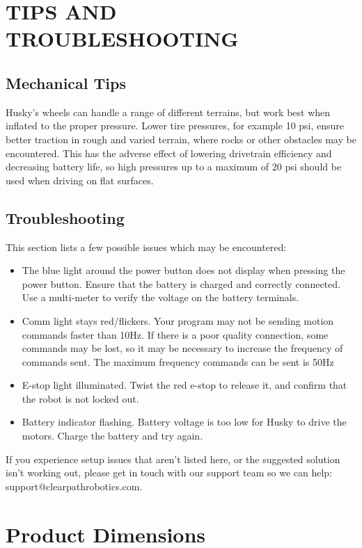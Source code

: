 \documentclass[]{clearpath-latex/clearpath-manual}
\begin{document}
\section{TIPS AND TROUBLESHOOTING}

\subsection{Mechanical Tips}
Husky’s wheels can handle a range of different terrains, but work best when inflated to the proper pressure. 
Lower tire pressures, for example 10 psi, ensure better traction in rough and varied terrain, where rocks or 
other obstacles may be encountered. This has the adverse effect of lowering drivetrain efficiency and decreasing 
battery life, so high pressures up to a maximum of 20 psi should be used when driving on flat surfaces. 

\subsection{Troubleshooting}

This section lists a few possible issues which may be encountered:

\begin{itemize}
	\item The blue light around the power button does not display when pressing the power button. Ensure that the battery is charged and correctly connected. Use a multi-meter to verify the voltage on the battery terminals.
	\item Comm light stays red/flickers. Your program may not be sending motion commands faster than 10Hz. If there is a poor quality connection, some commands may be lost, so it may be necessary to increase the frequency of commands sent. The maximum frequency commands can be sent is 50Hz
	\item E-stop light illuminated. Twist the red e-stop to release it, and confirm that the robot is not locked out.
	\item Battery indicator flashing. Battery voltage is too low for Husky to drive the motors. Charge the battery and try again.
\end{itemize}
	
If you experience setup issues that aren’t listed here, or the suggested solution isn’t working out, please get in touch with our support team so we can help: support@clearpathrobotics.com.

\newpage
\section{Product Dimensions}
\end{document}
